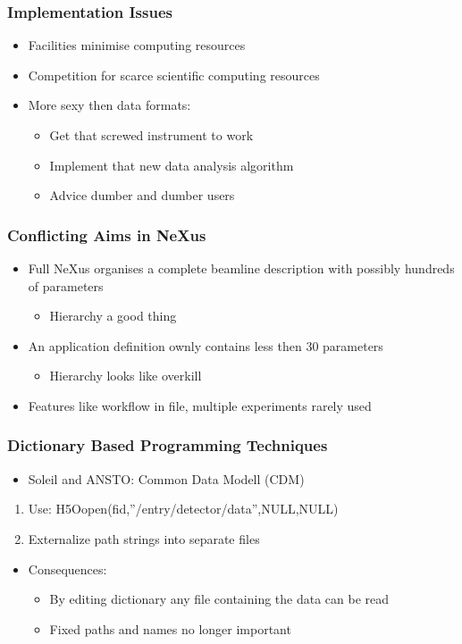 \documentclass{beamer}
\begin{document}
\begin{frame}
\frametitle{Implementation Issues}
\begin{itemize}
\item Facilities minimise computing resources 
\item Competition for scarce scientific computing resources
\item More sexy then data formats:
\begin{itemize}
\item Get that screwed instrument to work
\item Implement that new data analysis algorithm
\item Advice dumber and dumber users
\end{itemize}
\end{itemize}
\end{frame}

\begin{frame}
\frametitle{Conflicting Aims in NeXus}
\begin{itemize}
\item Full NeXus organises a complete beamline description with 
  possibly hundreds of parameters 
\begin{itemize}
\item Hierarchy a good thing
\end{itemize}
\item An application definition ownly contains less then 30 parameters
\begin{itemize}
\item Hierarchy looks like overkill
\end{itemize}
\item Features like workflow in file, multiple experiments rarely used
\end{itemize}
\end{frame}

\begin{frame}
\frametitle{Dictionary Based Programming Techniques}
\begin{itemize}
\item Soleil and ANSTO: Common Data Modell (CDM)
\end{itemize}
\begin{enumerate}
\item Use: H5Oopen(fid,''/entry/detector/data'',NULL,NULL)
\item Externalize path strings into separate files
\end{enumerate}
\begin{itemize}
\item Consequences:
\begin{itemize}
\item By editing dictionary any file containing the data can be read
\item Fixed paths and names no longer important
\end{itemize}
\end{itemize}
\end{frame}
\end{document}
